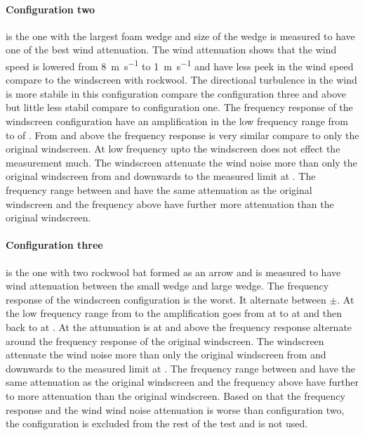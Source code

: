 \paragraph{Configuration two} is the one with the largest foam wedge and size of the wedge is measured to have one of the best wind attenuation. The wind attenuation shows that the wind speed is lowered from \SI{8}{\meter\per\second} to \SI{1}{\meter\per\second} and have less peek in the wind speed compare to the windscreen with rockwool. The directional turbulence in the wind is more stabile in this configuration compare the configuration three and above but little less stabil compare to configuration one. The frequency response of the windscreen configuration have an amplification in the low frequency range from  to  of  . From  and above the frequency response is very similar compare to only the original windscreen. At low frequency upto  the windscreen does not effect the measurement much. The windscreen attenuate the wind noise  more than only the original windscreen from  and downwards to the measured limit at . The frequency range between  and  have the same attenuation as the original windscreen and the frequency above have further  more attenuation than the original windscreen.

\paragraph{Configuration three} is the one with two rockwool bat formed as an arrow and is measured to have wind attenuation between the small wedge and large wedge. The frequency response of the windscreen configuration is the worst. It alternate between $\pm$. At the low frequency range from  to  the amplification goes from  at  to  at  and then back to   at . At   the attunuation is at  and above the frequency response alternate around the frequency response of the original windscreen. The windscreen attenuate the wind noise  more than only the original windscreen from  and downwards to the measured limit at . The frequency range between  and  have the same attenuation as the original windscreen and the frequency above have further  to  more attenuation than the original windscreen. Based on that the frequency response and the wind wind noise attenuation is worse than configuration two, the configuration is excluded from the rest of the test and is not used.

